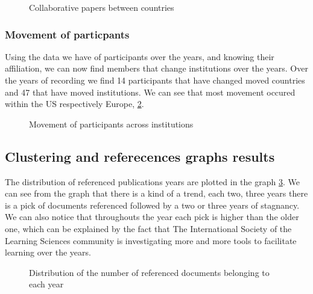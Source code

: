 \documentclass[journal,twocolumn]{IEEEtran}
\begin{document}
    \begin{figure}
        \begin{center}\end{center}
        \caption{Collaborative papers between countries}
        \label{figcollab}
    \end{figure}
    
    \hypertarget{movement-of-particpants}{%
\subsubsection{Movement of particpants}\label{movement-of-particpants}}

Using the data we have of participants over the years, and knowing their
affiliation, we can now find members that change institutions over the
years. Over the years of recording we find 14 participants that have
changed moved countries and 47 that have moved institutions. We can see
that most movement occured within the US respectively Europe,
\ref{fig_move}.


    \begin{figure}
        \begin{center}\end{center}
        \caption{Movement of participants across institutions}
        \label{fig_move}
    \end{figure}
    
    \hypertarget{clustering-and-referecences-graphs-results}{%
\subsection{Clustering and referecences graphs
results}\label{clustering-and-referecences-graphs-results}}

The distribution of referenced publications years are plotted in the
graph \ref{count_ref_docs}. We can see from the graph that there is a
kind of a trend, each two, three years there is a pick of documents
referenced followed by a two or three years of stagnancy. We can also
notice that throughouts the year each pick is higher than the older one,
which can be explained by the fact that The International Society of the
Learning Sciences community is investigating more and more tools to
facilitate learning over the years.


    \begin{figure}
        \begin{center}\end{center}
        \caption{Distribution of the number of referenced documents belonging to each year}
        \label{count_ref_docs}
    \end{figure}
    
\end{document}
